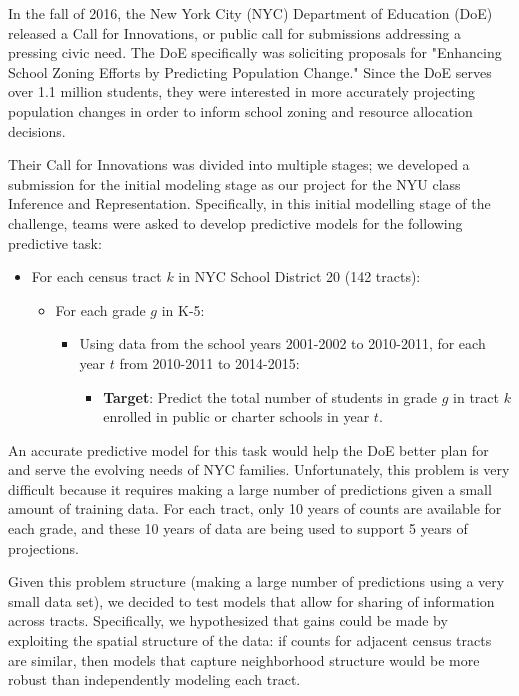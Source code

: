 \documentclass[journal]{IEEEtran}
\begin{document}
In the fall of 2016, the New York City (NYC) Department of Education (DoE) released a Call for Innovations, or public call for submissions addressing a pressing civic need. The DoE specifically was soliciting proposals for "Enhancing School Zoning Efforts by Predicting Population Change." Since the DoE serves over 1.1 million students, they were interested in more accurately projecting population changes in order to inform school zoning and resource allocation decisions.

Their Call for Innovations was divided into multiple stages; we developed a submission for the initial modeling stage as our project for the NYU class Inference and Representation. Specifically, in this initial modelling stage of the challenge, teams were asked to develop predictive models for the following predictive task:
\begin{itemize}
\item For each census tract $k$ in NYC School District 20 (142 tracts):
\begin{itemize}
\item For each grade $g$ in K-5:
\begin{itemize}
\item Using data from the school years 2001-2002 to 2010-2011, for each year $t$ from 2010-2011 to 2014-2015:
\begin{itemize}
\item \textbf{Target}: Predict the total number of students in grade $g$ in tract $k$ enrolled in public or charter schools in year $t$.
\end{itemize}
\end{itemize}
\end{itemize}
\end{itemize}
An accurate predictive model for this task would help the DoE better plan for and serve the evolving needs of NYC families. Unfortunately, this problem is very difficult because it requires making a large number of predictions given a small amount of training data.  For each tract, only 10 years of counts are available for each grade, and these 10 years of data are being used to support 5 years of projections.

Given this problem structure (making a large number of predictions using a very small data set), we decided to test models that allow for sharing of information across tracts. Specifically, we hypothesized that gains could be made by exploiting the spatial structure of the data: if counts for adjacent census tracts are similar, then models that capture neighborhood structure would be more robust than independently modeling each tract.
\end{document}
